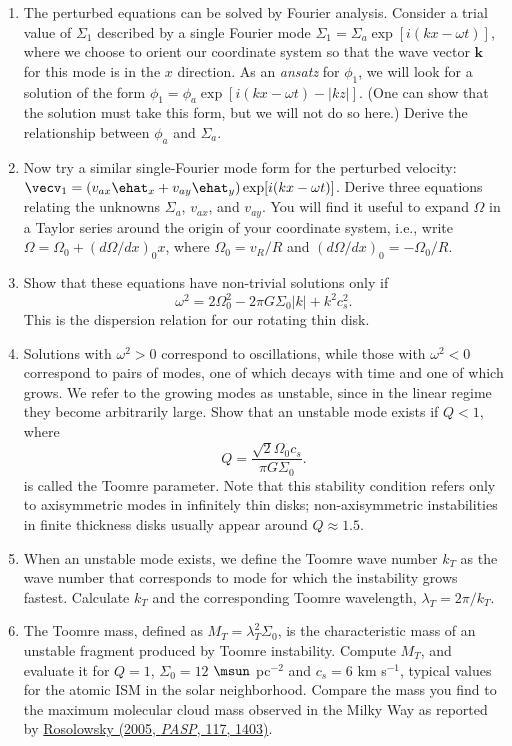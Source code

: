 \documentclass[twoside]{tufte-book} %
\begin{document}
\begin{enumerate}
\begin{enumerate}
\item The perturbed equations can be solved by Fourier analysis. Consider a trial value of $\Sigma_1$ described by a single Fourier mode $\Sigma_1 = \Sigma_a \exp[i(kx - \omega t)]$, where we choose to orient our coordinate system so that the wave vector $\mathbf{k}$ for this mode is in the $x$ direction. As an {\it ansatz} for $\phi_1$, we will look for a solution of the form $\phi_1 = \phi_a \exp[i(kx - \omega t) - |k z|]$. (One can show that the solution must take this form, but we will not do so here.) Derive the relationship between $\phi_a$ and $\Sigma_a$.
\item Now try a similar single-Fourier mode form for the perturbed velocity: $\vecv_1 = (v_{ax} \ehat_x + v_{ay} \ehat_y) \exp[i(kx - \omega t)]$. Derive three equations relating the unknowns $\Sigma_a$, $v_{ax}$, and $v_{ay}$. You will find it useful to expand $\Omega$ in a Taylor series around the origin of your coordinate system, i.e., write $\Omega = \Omega_0 + (d\Omega/dx)_0 x$, where $\Omega_0 = v_R/R$ and $(d\Omega/dx)_{0} = -\Omega_0/R$.
\item Show that these equations have non-trivial solutions only if
\begin{displaymath}
\omega^2 = 2 \Omega_0^2 - 2 \pi G \Sigma_0 |k| + k^2 c_s^2.
\end{displaymath}
This is the dispersion relation for our rotating thin disk.
\item Solutions with $\omega^2 > 0$ correspond to oscillations, while those with $\omega^2 < 0$ correspond to pairs of modes, one of which decays with time and one of which grows. We refer to the growing modes as unstable, since in the linear regime they become arbitrarily large. Show that an unstable mode exists if $Q<1$, where
\begin{displaymath}
Q = \frac{\sqrt{2} \Omega_0 c_s}{\pi G \Sigma_0}.
\end{displaymath}
is called the Toomre parameter. Note that this stability condition refers only to axisymmetric modes in infinitely thin disks; non-axisymmetric instabilities in finite thickness disks usually appear around $Q\approx 1.5$.
\item When an unstable mode exists, we define the Toomre wave number $k_T$ as the wave number that corresponds to mode for which the instability grows fastest. Calculate $k_T$ and the corresponding Toomre wavelength, $\lambda_T = 2\pi / k_T$.
\item The Toomre mass, defined as $M_T =  \lambda_T^2 \Sigma_0$, is the characteristic mass of an unstable fragment produced by Toomre instability. Compute $M_T$, and evaluate it for $Q=1$, $\Sigma_0=12$ $\msun$ pc$^{-2}$ and $c_s = 6$ km s$^{-1}$, typical values for the atomic ISM in the solar neighborhood. Compare the mass you find to the maximum molecular cloud mass observed in the Milky Way as reported by \href{http://adsabs.harvard.edu/abs/2005PASP..117.1403R}{Rosolowsky (2005, {\it PASP}, 117, 1403)}. \nocite{rosolowsky05b}\\
\end{enumerate}






\end{enumerate}
\end{document}

